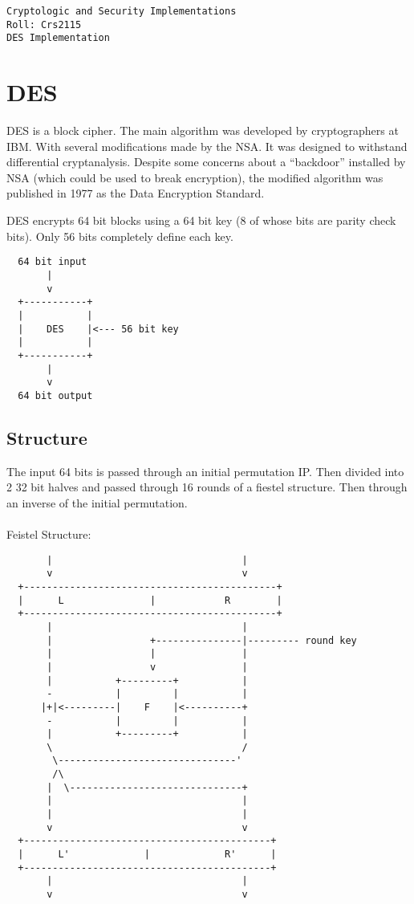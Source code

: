 \documentclass{article}
\begin{document}
\begin{verbatim}
Cryptologic and Security Implementations
Roll: Crs2115
DES Implementation
\end{verbatim}

\section{DES}
DES is a block cipher. The main algorithm was developed by cryptographers at IBM. With several modifications made by the NSA. It was designed to withstand differential cryptanalysis. Despite some concerns about a ``backdoor'' installed by NSA (which could be used to break encryption), the modified algorithm was published in 1977 as the Data Encryption Standard.

DES encrypts 64 bit blocks using a 64 bit key (8 of whose bits are parity check bits). Only 56 bits completely define each key.


\begin{verbatim}
  64 bit input
       |
       v
  +-----------+
  |           |
  |    DES    |<--- 56 bit key
  |           |
  +-----------+
       |
       v
  64 bit output

\end{verbatim}

\subsection{Structure}
The input 64 bits is passed through an initial permutation IP. Then divided into 2 32 bit halves and passed through 16 rounds of a fiestel structure. Then through an inverse of the initial permutation.\\
\\
Feistel Structure:
\small
\begin{verbatim}
       |                                 |
       v                                 v
  +--------------------------------------------+
  |      L               |            R        |
  +--------------------------------------------+
       |                                 |
       |                 +---------------|--------- round key
       |                 |               |
       |                 v               |
       |           +---------+           |
       -           |         |           |
      |+|<---------|    F    |<----------+
       -           |         |           |
       |           +---------+           |
       \                                 /
        \-------------------------------'
        /\ 
       |  \------------------------------+
       |                                 |
       |                                 |
       v                                 v
  +-------------------------------------------+
  |      L'             |             R'      |
  +-------------------------------------------+
       |                                 |
       v                                 v
\end{verbatim}
\normalsize
\end{document}
